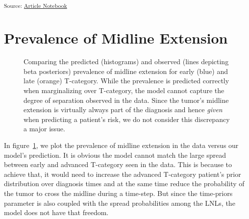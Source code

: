 \documentclass[
  sn-mathphys-num,
]{sn-jnl}
\begin{document}
\textsubscript{Source:
\href{https://rmnldwg.github.io/bilateral-paper/manuscript-preview.html}{Article
Notebook}}

\section{Prevalence of Midline
Extension}\label{prevalence-of-midline-extension}

\begin{figure}


\caption{\label{fig-model-prevalences-midext}Comparing the predicted
(histograms) and observed (lines depicting beta posteriors) prevalence
of midline extension for early (blue) and late (orange) T-category.
While the prevalence is predicted correctly when marginalizing over
T-category, the model cannot capture the degree of separation observed
in the data. Since the tumor's midline extension is virtually always
part of the diagnosis and hence \emph{given} when predicting a patient's
risk, we do not consider this discrepancy a major issue.}

\end{figure}%

In figure~\ref{fig-model-prevalences-midext}, we plot the prevalence of
midline extension in the data versus our model's prediction. It is
obvious the model cannot match the large spread between early and
advanced T-category seen in the data. This is because to achieve that,
it would need to increase the advanced T-category patient's prior
distribution over diagnosis times and at the same time reduce the
probability of the tumor to cross the midline during a time-step. But
since the time-priors parameter is also coupled with the spread
probabilities among the LNLs, the model does not have that freedom.
\end{document}

